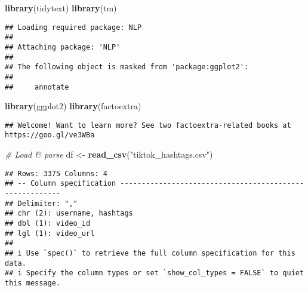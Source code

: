\documentclass[
]{article}
\newenvironment{Shaded}{\begin{snugshade}}{\end{snugshade}}
\newcommand{\CommentTok}[1]{\textcolor[rgb]{0.56,0.35,0.01}{\textit{#1}}}
\newcommand{\FunctionTok}[1]{\textcolor[rgb]{0.13,0.29,0.53}{\textbf{#1}}}
\newcommand{\NormalTok}[1]{#1}
\newcommand{\OtherTok}[1]{\textcolor[rgb]{0.56,0.35,0.01}{#1}}
\newcommand{\StringTok}[1]{\textcolor[rgb]{0.31,0.60,0.02}{#1}}
\begin{document}
\begin{Shaded}
\begin{Highlighting}[]
\FunctionTok{library}\NormalTok{(tidytext)}
\FunctionTok{library}\NormalTok{(tm)}
\end{Highlighting}
\end{Shaded}

\begin{verbatim}
## Loading required package: NLP
## 
## Attaching package: 'NLP'
## 
## The following object is masked from 'package:ggplot2':
## 
##     annotate
\end{verbatim}

\begin{Shaded}
\begin{Highlighting}[]
\FunctionTok{library}\NormalTok{(ggplot2)}
\FunctionTok{library}\NormalTok{(factoextra)}
\end{Highlighting}
\end{Shaded}

\begin{verbatim}
## Welcome! Want to learn more? See two factoextra-related books at https://goo.gl/ve3WBa
\end{verbatim}

\begin{Shaded}
\begin{Highlighting}[]
\CommentTok{\# Load \& parse}
\NormalTok{df }\OtherTok{\textless{}{-}} \FunctionTok{read\_csv}\NormalTok{(}\StringTok{"tiktok\_hashtags.csv"}\NormalTok{)}
\end{Highlighting}
\end{Shaded}

\begin{verbatim}
## Rows: 3375 Columns: 4
## -- Column specification --------------------------------------------------------
## Delimiter: ","
## chr (2): username, hashtags
## dbl (1): video_id
## lgl (1): video_url
## 
## i Use `spec()` to retrieve the full column specification for this data.
## i Specify the column types or set `show_col_types = FALSE` to quiet this message.
\end{verbatim}
\end{document}

